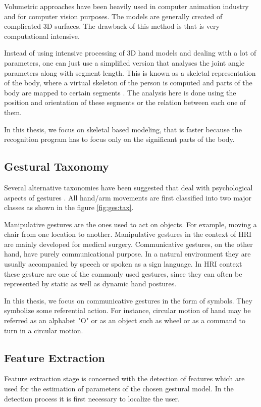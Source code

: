 Volumetric approaches have been heavily used in computer animation industry and for computer vision purposes. The models are generally created of complicated 3D surfaces. The drawback of this method is that is very computational intensive. 

Instead of using intensive processing of 3D hand models and dealing with a lot of parameters, one can just use a simplified version that analyses the joint angle parameters along with segment length. This is known as a skeletal representation of the body, where a virtual skeleton of the person is computed and parts of the body are mapped to certain segments \cite{4}. The analysis here is done using the position and orientation of these segments or the relation between each one of them.

In this thesis, we focus on skeletal based modeling, that is faster because the recognition program has to focus only on the significant parts of the body.

\subsection{Gestural Taxonomy}
Several alternative taxonomies have been suggested that deal with psychological aspects of gestures \cite{3}. All hand/arm movements are first classified into two major classes as shown in the figure \ref{fig:ges:tax}.

Manipulative gestures are the ones used to act on objects. For example, moving a chair from one location to another. Manipulative gestures in the context of HRI are mainly developed for medical surgery. Communicative gestures, on the other hand, have purely communicational purpose. In a natural environment they are usually accompanied by speech or spoken as a sign language. In HRI context these gesture are one of the commonly used gestures, since they can often be represented by static as well as dynamic hand postures.

In this thesis, we focus on communicative gestures in the form of symbols. They symbolize some referential action. For instance, circular motion of hand may be referred as an alphabet "O" or as an object such as wheel or as a command to turn in a circular motion.

\subsection{Feature Extraction}
Feature extraction stage is concerned with the detection of features which are used for the estimation of parameters of the chosen gestural model. In the detection process it is first necessary to localize the user. 

